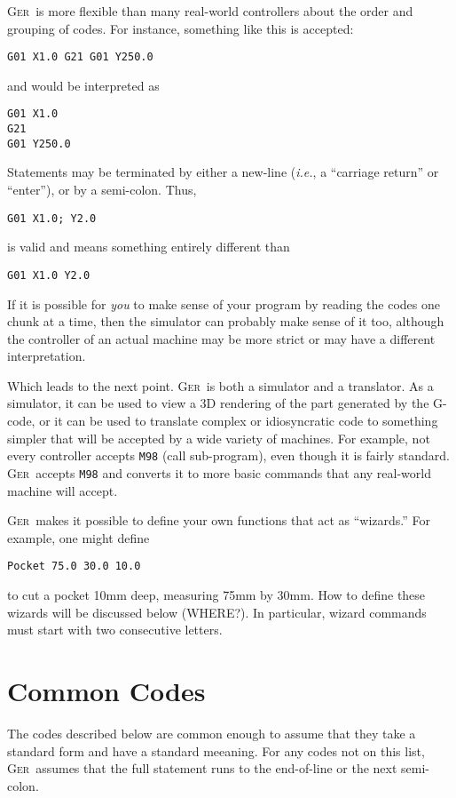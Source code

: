 \documentclass[titlepage,oneside,10pt]{article}
\newcommand{\ger}{\textsc{Ger}}
\begin{document}
\ger\ is more flexible than many real-world controllers about the order
and grouping of codes. For instance, something like this is accepted:
\begin{verbatim}
G01 X1.0 G21 G01 Y250.0
\end{verbatim}
and would be interpreted as
\begin{verbatim}
G01 X1.0 
G21 
G01 Y250.0
\end{verbatim}
Statements may be terminated by either a new-line (\emph{i.e.}, a
``carriage return'' or ``enter''), or by a semi-colon. Thus,
\begin{verbatim}
G01 X1.0; Y2.0
\end{verbatim}
is valid and means something entirely different than 
\begin{verbatim}
G01 X1.0 Y2.0
\end{verbatim}
If it is possible for \emph{you} to make sense of your program by 
reading the codes one chunk at a time, then the simulator can
probably make sense of it too, although the controller of an actual
machine may be more strict or may have a different interpretation.

Which leads to the next point. \ger\ is both a simulator and a
translator. As a simulator, it can be used to view a 3D rendering of
the part generated by the G-code, or it can be used to translate complex or
idiosyncratic code to something simpler that will be accepted by a
wide variety of machines. For example, not every controller accepts
{\tt M98} (call sub-program), even though it is fairly
standard. \ger\ accepts {\tt M98} and converts it to more basic
commands that any real-world machine will accept.

\ger\ makes it possible to define your own functions that act as
``wizards.'' For example, one might define
\begin{verbatim}
Pocket 75.0 30.0 10.0 
\end{verbatim}
to cut a pocket 10mm deep, measuring 75mm by 30mm. How to define these
wizards will be discussed below (WHERE?). In particular, wizard
commands must start with two consecutive letters.

\section{Common Codes}

The codes described below are common enough to assume that they take a
standard form and have a standard meeaning. For any codes not on this
list, \ger\ assumes that the full statement runs to the end-of-line or
the next semi-colon.
\end{document}

